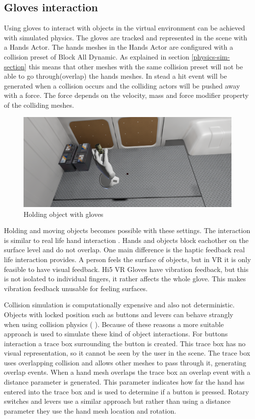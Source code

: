 \documentclass[12pt, a4paper,oneside, nocenter]{thesis}
\newcommand{\citeyearxamk}[1]{(\citeauthor{#1} \citeyear{#1})}
\begin{document}
\subsection{Gloves interaction}
Using gloves to interact with objects in the virtual environment can be achieved with simulated physics. The gloves are tracked and represented in the scene with a Hands Actor. The hands meshes in the Hands Actor are configured with a collision preset of Block All Dynamic. As explained in section \ref{physics-sim-section} this means that other meshes with the same collision preset will not be able to go through(overlap) the hands meshes. In stead a hit event will be generated when a collision occurs and the colliding actors will be pushed away with a force. The force depends on the velocity, mass and force modifier property of the colliding meshes.
\begin{figure}[H]
	\includegraphics[width=\textwidth]{gloves-grab}
	\caption{Holding object with gloves}
	\label{fig:gloves-grab}
\end{figure}
Holding and moving objects becomes possible with these settings. The interaction is similar to real life hand interaction . Hands and objects block eachother on the surface level and do not overlap. One main difference is the haptic feedback real life interaction provides. A person feels the surface of objects, but in VR it is only feasible to have visual feedback. Hi5 VR Gloves have vibration feedback, but this is not isolated to individual fingers, it rather affects the whole glove. This makes vibration feedback unusable for feeling surfaces.
\par
 Collision simulation is computationally expensive and also not deterministic. Objects with locked position such as buttons and levers can behave strangly when using collision physics \citeyearxamk{collaborative-vr}. Because of these reasons a more suitable approach is used to simulate these kind of object interactions. For buttons interaction a trace box surrounding the button is created. This trace box has no visual representation, so it cannot be seen by the user in the scene. The trace box uses overlapping collision and allows other meshes to pass through it, generating overlap events. When a hand mesh overlaps the trace box an overlap event with a distance parameter is generated. This parameter indicates how far the hand has entered into the trace box and is used to determine if a button is pressed. Rotary switches and levers use a similar approach but rather than using a distance parameter they use the hand mesh location and rotation.
\end{document}
